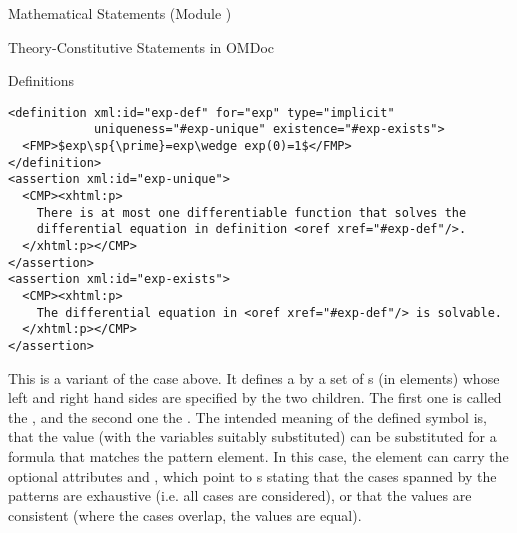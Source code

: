\begin{tchapter}[id=statements,short=Mathematical Statements]{Mathematical Statements (Module {})}
\begin{tsection}[id=definitions]{Theory-Constitutive Statements in OMDoc}
\begin{tsubsection}[id=definitions]{Definitions}
\begin{description}
\begin{lstlisting}[label=lst:exp-def,mathescape,
  caption={An Implicit Definition of the Exponential Function},
  index={definition,assertion,type,uniqueness,existence}]
<definition xml:id="exp-def" for="exp" type="implicit" 
            uniqueness="#exp-unique" existence="#exp-exists">
  <FMP>$exp\sp{\prime}=exp\wedge exp(0)=1$</FMP>
</definition>
<assertion xml:id="exp-unique">
  <CMP><xhtml:p>
    There is at most one differentiable function that solves the 
    differential equation in definition <oref xref="#exp-def"/>.
  </xhtml:p></CMP>
</assertion>
<assertion xml:id="exp-exists">
  <CMP><xhtml:p>
    The differential equation in <oref xref="#exp-def"/> is solvable.
  </xhtml:p></CMP>
</assertion>
\end{lstlisting}
\item[{\attval{inductive}{type}{definition}}] This is a variant of the
  {} case above. It defines a
  {} by a set of {s} (in
  {} elements) whose left and right hand sides are specified by the two
  children. The first one is called the {}, and the second one the
  {}. The intended meaning of the defined symbol is, that the value (with the
  variables suitably substituted) can be substituted for a formula that matches the
  pattern element. In this case, the {} element can carry the optional
  attributes {} and
  {}, which point to {}s stating
  that the cases spanned by the patterns are exhaustive (i.e. all cases are considered),
  or that the values are consistent (where the cases overlap, the values are equal).


\end{description}
\end{tsubsection}
\end{tsection}
\end{tchapter}
